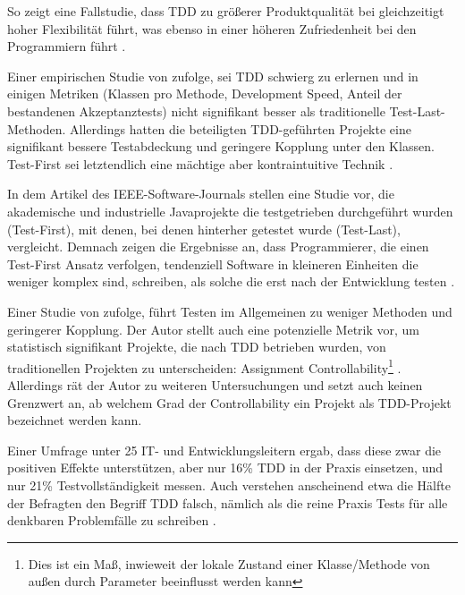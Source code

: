 
So zeigt eine Fallstudie, dass TDD zu größerer Produktqualität bei gleichzeitigt hoher Flexibilität führt, was ebenso in einer höheren Zufriedenheit bei den Programmiern führt \citep{hans_wasmus_evaluation_2007}.


Einer empirischen Studie von \citeauthor{madeyski_test-driven_2009} zufolge, sei TDD schwierg zu erlernen und in einigen Metriken (Klassen pro Methode, Development Speed, Anteil der bestandenen Akzeptanztests) nicht signifikant besser als traditionelle Test-Last-Methoden. Allerdings hatten die beteiligten TDD-geführten Projekte eine signifikant bessere Testabdeckung und geringere Kopplung unter den Klassen. Test-First sei letztendlich eine mächtige aber kontraintuitive Technik \citep{madeyski_test-driven_2009}.


In dem Artikel des IEEE-Software-Journals stellen \citeauthor{janzen_does_2008} eine Studie vor, die akademische und industrielle Javaprojekte die testgetrieben durchgeführt wurden (Test-First), mit denen, bei denen hinterher getestet wurde (Test-Last), vergleicht. Demnach zeigen die Ergebnisse an, dass Programmierer, die einen Test-First Ansatz verfolgen, tendenziell Software in kleineren Einheiten die weniger komplex sind, schreiben, als solche die erst nach der Entwicklung testen \citep{janzen_does_2008}.

Einer Studie von \citeauthor{mueller_effect_2006} zufolge, führt Testen im Allgemeinen zu weniger Methoden und geringerer Kopplung. Der Autor stellt auch eine potenzielle Metrik vor, um statistisch signifikant Projekte, die nach TDD betrieben wurden, von traditionellen Projekten zu unterscheiden: Assignment Controllability\footnote{Dies ist ein Maß, inwieweit der lokale Zustand einer Klasse/Methode von außen durch Parameter beeinflusst werden kann} \citep{mueller_effect_2006}. Allerdings rät der Autor zu weiteren Untersuchungen und setzt auch keinen Grenzwert an, ab welchem Grad der Controllability ein Projekt als TDD-Projekt bezeichnet werden kann.

Einer Umfrage unter 25 IT- und Entwicklungsleitern ergab, dass diese zwar die positiven Effekte unterstützen, aber nur 16\% TDD in der Praxis einsetzen, und nur 21\% Testvollständigkeit messen. Auch verstehen anscheinend etwa die Hälfte der Befragten den Begriff TDD falsch, nämlich als die reine Praxis Tests für alle denkbaren Problemfälle zu schreiben \citep{stelligent_inc_stelligent_2007}.

